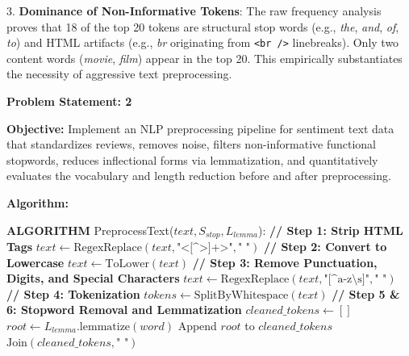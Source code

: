 \documentclass[12pt]{article}
\begin{document}
3. \textbf{Dominance of Non-Informative Tokens}: The raw frequency analysis proves that 18 of the top 20 tokens are structural stop words (e.g., \textit{the}, \textit{and}, \textit{of}, \textit{to}) and HTML artifacts (e.g., \textit{br} originating from \texttt{<br />} linebreaks). Only two content words (\textit{movie}, \textit{film}) appear in the top 20. This empirically substantiates the necessity of aggressive text preprocessing.

\vspace{0.4cm}


\textbf{Problem Statement: 2}

\textbf{Objective:} Implement an NLP preprocessing pipeline for sentiment text data that standardizes reviews, removes noise, filters non-informative functional stopwords, reduces inflectional forms via lemmatization, and quantitatively evaluates the vocabulary and length reduction before and after preprocessing.

\vspace{0.2cm}
\textbf{Algorithm:}

\begin{algorithm}[H]
\caption{Comprehensive Text Preprocessing Pipeline}
\begin{algorithmic}[1]
\State \textbf{ALGORITHM} PreprocessText($text, S_{stop}, L_{lemma}$):
    \State \textbf{// Step 1: Strip HTML Tags}
    \State $text \gets \text{RegexReplace}(text, \text{"<[\textasciicircum>]+>"}, \text{" "})$
    \State \textbf{// Step 2: Convert to Lowercase}
    \State $text \gets \text{ToLower}(text)$
    \State \textbf{// Step 3: Remove Punctuation, Digits, and Special Characters}
    \State $text \gets \text{RegexReplace}(text, \text{"[\textasciicircum a-z\textbackslash s]"}, \text{" "})$
    \State \textbf{// Step 4: Tokenization}
    \State $tokens \gets \text{SplitByWhitespace}(text)$
    \State \textbf{// Step 5 \& 6: Stopword Removal and Lemmatization}
    \State $cleaned\_tokens \gets []$
            \State $root \gets L_{lemma}.\text{lemmatize}(word)$
            \State Append $root$ to $cleaned\_tokens$
        \EndIf
    \EndFor
    \State \Return $\text{Join}(cleaned\_tokens, \text{" "})$
\end{algorithmic}
\end{algorithm}
\end{document}
